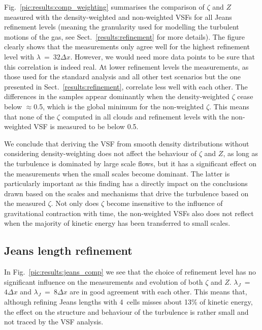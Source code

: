 Fig.~\ref{pic:results:comp_weighting} summarises the comparison of $\zeta$ and $Z$ measured with the density-weighted and non-weighted VSFs for all Jeans refinement levels (meaning the granularity used for modelling the turbulent motions of the gas, see Sect.~\ref{results:refinement} for more details).
The figure clearly shows that the measurements only agree well for the highest refinement level with $\lambda~=~32\Delta x$.
However, we would need more data points to be sure that this correlation is indeed real.
At lower refinement levels the measurements, as those used for the standard analysis and all other test scenarios but the one presented in Sect.~\ref{results:refinement}, correlate less well with each other. 
The differences in the samples appear dominantly when the density-weighted $\zeta$ cease below $\approx$0.5, which is the global minimum for the non-weighted $\zeta$. 
This means that none of the $\zeta$ computed in all clouds and refinement levels with the non-weighted VSF is measured to be below 0.5.

We conclude that deriving the VSF from smooth density distributions without considering density-weighting does not affect the behaviour of $\zeta$ and $Z$, as long as the turbulence is dominated by large scale flows, but it has a significant effect on the measurements when the small scales become dominant.
The latter is particularly important as this finding has a directly impact on the conclusions drawn based on the scales and mechanisms that drive the turbulence based on the measured $\zeta$.
Not only does $\zeta$ become insensitive to the influence of gravitational contraction with time, the non-weighted VSFs also does not reflect when the majority of kinetic energy has been transferred to small scales. 


\subsection{Jeans length refinement}\label{discussion:refinement}

In Fig.~\ref{pic:results:jeans_comp} we see that the choice of refinement level has no significant influence on the measurements and evolution of both $\zeta$ and $Z$. 
$\lambda_J$~=~$4\Delta{}x$ and $\lambda_J$~=~$8\Delta{}x$ are in good agreement with each other.
This means that, although refining Jeans lengths with 4~cells misses about 13\% of kinetic energy, the effect on the structure and behaviour of the turbulence is rather small and not traced by the VSF analysis.

